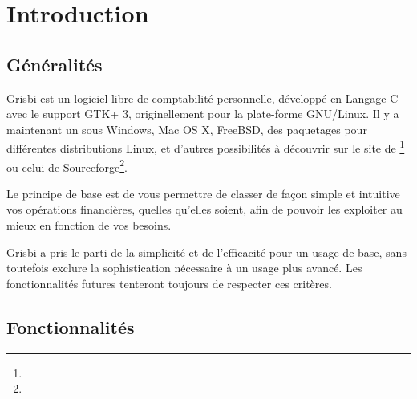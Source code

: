 
\chapter{Introduction\label{introduction}}


\section{Généralités\label{introduction-general}}


Grisbi est un \gls{logiciel libre} de comptabilité personnelle, développé en \gls{Langage C} avec le support \gls{GTK}+ 3, originellement pour la plate-forme \gls{GNU/Linux}. Il y a maintenant un  sous \gls{Windows}, \gls{Mac OS X}, FreeBSD, des paquetages pour différentes \gls{distributions Linux}, et d'autres possibilités à découvrir sur le site de \footnote{\urlGrisbi{}} ou celui de {Sourceforge}\footnote{\urlSourceForge{}}.

Le principe de base est de vous permettre de classer de façon simple et intuitive vos opérations financières, quelles qu’elles soient, afin de pouvoir les exploiter au mieux en fonction de vos besoins.

Grisbi a pris le parti de la simplicité et de l'efficacité pour un usage de
base, sans toutefois exclure la sophistication nécessaire à un usage plus avancé. Les fonctionnalités futures tenteront toujours de respecter ces critères.


\section{Fonctionnalités\label{introduction-features}}


